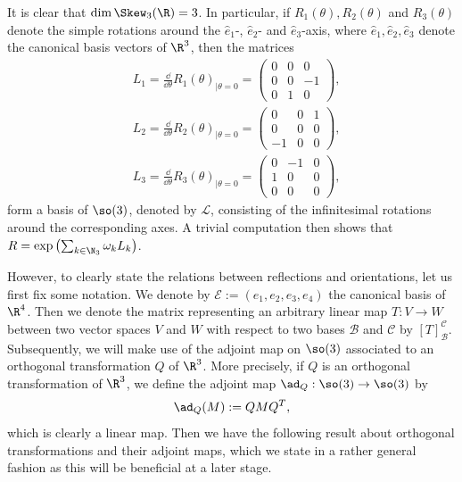 It is clear that $\dim \Skew_3(\R) = 3$. In particular, if $R_1(\theta), R_2(\theta)$ and $R_3(\theta)$ denote the simple rotations around the $\hat{e}_1$-, $\hat{e}_2$- and $\hat{e}_3$-axis, where $\hat{e}_1, \hat{e}_2, \hat{e}_3$ denote the canonical basis vectors of $\R^3$, then the matrices
\begin{align}
\label{eq: L1}
	&L_1 = \frac{\dd}{\dd\theta}R_1(\theta)_{\mid \theta =0} = \left(\begin{array}{ccc}
	0 & 0 & 0 \\ 
	0 & 0 & -1 \\ 
	0 & 1 & 0
	\end{array}  \right ),\\
\label{eq: L2}
	&L_2 = \frac{\dd}{\dd\theta}R_2(\theta)_{\mid \theta =0} = \left (\begin{array}{ccc}
	0 & 0 & 1 \\ 
	0 & 0 & 0 \\ 
	-1 & 0 & 0
	\end{array}  \right ),\\
\label{eq: L3}
	&L_3 = \frac{\dd}{\dd\theta}R_3(\theta)_{\mid \theta =0} = \left (\begin{array}{ccc}
	0 & -1 & 0 \\ 
	1 & 0 & 0 \\ 
	0 & 0 & 0
	\end{array}  \right ),
\end{align}
form a basis of $\so(3)$, denoted by $\mathcal{L}$, consisting of the infinitesimal rotations around the corresponding axes. A trivial computation then shows that $R = \exp\left ( \sum_{k \in \N_3} \omega_k L_k \right )$. 

However, to clearly state the relations between reflections and orientations, let us first fix some notation. We denote by $\mathcal{E} := (e_1, e_2, e_3, e_4)$ the canonical basis of $\R^4$. Then we denote the matrix representing an arbitrary linear map $T: V \to W$ between two vector spaces $V$ and $W$ with respect to two bases $\mathcal{B}$ and $\mathcal{C}$ by $[T]_{\mathcal{B}}^{\mathcal{C}}$. Subsequently, we will make use of the adjoint map on $\so(3)$ associated to an orthogonal transformation $Q$ of $\R^3$. More precisely, if $Q$ is an orthogonal transformation of $\R^3$, we define the adjoint map $\ad_Q : \so(3) \to \so(3)$ by
\begin{equation}
\ad_Q(M) := Q M Q^T,
\end{equation}
which is clearly a linear map. Then we have the following result about orthogonal transformations and their adjoint maps, which we state in a rather general fashion as this will be beneficial at a later stage.

